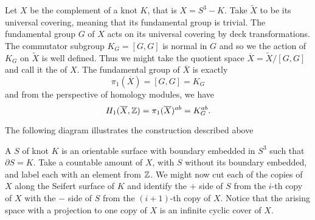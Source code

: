 Let $X$ be the complement of a knot $K$, that is $X=S^3-K$. Take $\widetilde{X}$ to be its universal covering, meaning that its fundamental group is trivial. The fundamental group $G$ of $X$ acts on its universal covering by deck transformations. The commutator subgroup $K_G=[G, G]$ is normal in $G$ and so we the action of $K_G$ on $\widetilde{X}$ is well defined. Thus we might take the quotient space $\overline{X}=\widetilde{X}/[G, G]$ and call it the  of $X$. The fundamental group of $\overline{X}$ is exactly 
$$\pi_1(\overline{X})=[G, G]=K_G$$
and from the perspective of homology modules, we have
$$H_1(\overline{X}, \operatorname{\mathbb{Z}})=\pi_1(\overline{X})^{ab}=K_G^{ab}.$$

The following diagram illustrates the construction described above

\def\actson{
  \begin{tikzpicture}[baseline]
    \draw[->](0, 0) arc (-120:180:.5em);
  \end{tikzpicture}
}

\begin{center}
\end{center}

%

A  $S$ of knot $K$ is an orientable surface with boundary embedded in $S^3$ such that $\partial S=K$. Take a countable amount of $X$, with $S$ without its boundary embedded, and label each with an element from $\operatorname{\mathbb{Z}}$. We might now cut each of the copies of $X$ along the Seifert surface of $K$ and identify the $+$ side of $S$ from the $i$-th copy of $X$ with the $-$ side of $S$ from the $(i+1)$-th copy of $X$. Notice that the arising space with a projection to one copy of $X$ is an infinite cyclic cover of $X$.

